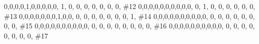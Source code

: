 \documentclass[
  letterpaper,
  DIV=11,
  numbers=noendperiod]{scrreprt}
\newenvironment{Shaded}{\begin{snugshade}}{\end{snugshade}}
\newcommand{\CommentTok}[1]{\textcolor[rgb]{0.37,0.37,0.37}{#1}}
\newcommand{\DecValTok}[1]{\textcolor[rgb]{0.68,0.00,0.00}{#1}}
\newcommand{\NormalTok}[1]{\textcolor[rgb]{0.00,0.23,0.31}{#1}}
\begin{document}
\begin{Shaded}
\begin{Highlighting}[]
               \DecValTok{0}\NormalTok{,}\DecValTok{0}\NormalTok{,}\DecValTok{0}\NormalTok{,}\DecValTok{0}\NormalTok{,}\DecValTok{1}\NormalTok{,}\DecValTok{0}\NormalTok{,}\DecValTok{0}\NormalTok{,}\DecValTok{0}\NormalTok{,}\DecValTok{0}\NormalTok{,}\DecValTok{0}\NormalTok{, }\DecValTok{1}\NormalTok{, }\DecValTok{0}\NormalTok{, }\DecValTok{0}\NormalTok{, }\DecValTok{0}\NormalTok{, }\DecValTok{0}\NormalTok{, }\DecValTok{0}\NormalTok{, }\DecValTok{0}\NormalTok{, }\DecValTok{0}\NormalTok{, }\CommentTok{\#12}
               \DecValTok{0}\NormalTok{,}\DecValTok{0}\NormalTok{,}\DecValTok{0}\NormalTok{,}\DecValTok{0}\NormalTok{,}\DecValTok{0}\NormalTok{,}\DecValTok{0}\NormalTok{,}\DecValTok{0}\NormalTok{,}\DecValTok{0}\NormalTok{,}\DecValTok{0}\NormalTok{,}\DecValTok{0}\NormalTok{, }\DecValTok{0}\NormalTok{, }\DecValTok{1}\NormalTok{, }\DecValTok{0}\NormalTok{, }\DecValTok{0}\NormalTok{, }\DecValTok{0}\NormalTok{, }\DecValTok{0}\NormalTok{, }\DecValTok{0}\NormalTok{, }\DecValTok{0}\NormalTok{, }\CommentTok{\#13}
               \DecValTok{0}\NormalTok{,}\DecValTok{0}\NormalTok{,}\DecValTok{0}\NormalTok{,}\DecValTok{0}\NormalTok{,}\DecValTok{0}\NormalTok{,}\DecValTok{0}\NormalTok{,}\DecValTok{0}\NormalTok{,}\DecValTok{1}\NormalTok{,}\DecValTok{0}\NormalTok{,}\DecValTok{0}\NormalTok{, }\DecValTok{0}\NormalTok{, }\DecValTok{0}\NormalTok{, }\DecValTok{0}\NormalTok{, }\DecValTok{0}\NormalTok{, }\DecValTok{0}\NormalTok{, }\DecValTok{0}\NormalTok{, }\DecValTok{0}\NormalTok{, }\DecValTok{1}\NormalTok{, }\CommentTok{\#14}
               \DecValTok{0}\NormalTok{,}\DecValTok{0}\NormalTok{,}\DecValTok{0}\NormalTok{,}\DecValTok{0}\NormalTok{,}\DecValTok{0}\NormalTok{,}\DecValTok{0}\NormalTok{,}\DecValTok{0}\NormalTok{,}\DecValTok{0}\NormalTok{,}\DecValTok{0}\NormalTok{,}\DecValTok{0}\NormalTok{, }\DecValTok{0}\NormalTok{, }\DecValTok{0}\NormalTok{, }\DecValTok{0}\NormalTok{, }\DecValTok{0}\NormalTok{, }\DecValTok{0}\NormalTok{, }\DecValTok{0}\NormalTok{, }\DecValTok{0}\NormalTok{, }\DecValTok{0}\NormalTok{, }\CommentTok{\#15}
               \DecValTok{0}\NormalTok{,}\DecValTok{0}\NormalTok{,}\DecValTok{0}\NormalTok{,}\DecValTok{0}\NormalTok{,}\DecValTok{0}\NormalTok{,}\DecValTok{0}\NormalTok{,}\DecValTok{0}\NormalTok{,}\DecValTok{0}\NormalTok{,}\DecValTok{0}\NormalTok{,}\DecValTok{0}\NormalTok{, }\DecValTok{0}\NormalTok{, }\DecValTok{0}\NormalTok{, }\DecValTok{0}\NormalTok{, }\DecValTok{0}\NormalTok{, }\DecValTok{0}\NormalTok{, }\DecValTok{0}\NormalTok{, }\DecValTok{0}\NormalTok{, }\DecValTok{0}\NormalTok{, }\CommentTok{\#16}
               \DecValTok{0}\NormalTok{,}\DecValTok{0}\NormalTok{,}\DecValTok{0}\NormalTok{,}\DecValTok{0}\NormalTok{,}\DecValTok{0}\NormalTok{,}\DecValTok{0}\NormalTok{,}\DecValTok{0}\NormalTok{,}\DecValTok{0}\NormalTok{,}\DecValTok{0}\NormalTok{,}\DecValTok{0}\NormalTok{, }\DecValTok{0}\NormalTok{, }\DecValTok{0}\NormalTok{, }\DecValTok{0}\NormalTok{, }\DecValTok{0}\NormalTok{, }\DecValTok{0}\NormalTok{, }\DecValTok{0}\NormalTok{, }\DecValTok{0}\NormalTok{, }\DecValTok{0}\NormalTok{, }\CommentTok{\#17}

\end{Highlighting}
\end{Shaded}
\end{document}
